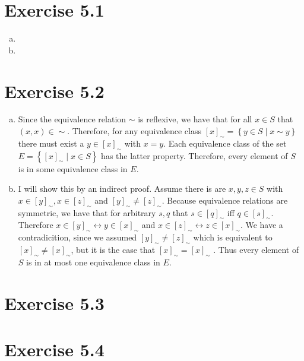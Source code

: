 \documentclass{article} %
\newcommand{\homeworkNumber}{5}
\begin{document}
\section*{Exercise \homeworkNumber.1}

\begin{enumerate}[(a)]
	\item
	\item
\end{enumerate}



\section*{Exercise \homeworkNumber.2}

\begin{enumerate}[(a)]
	\item Since the equivalence relation \( \sim \) is reflexive, we have that for all \( x \in S \) that \( (x, x) \in \sim \).
	      Therefore, for any equivalence class \( [x]_{\sim} =  \left\{ y \in S \mid x \sim y \right\}  \) there must exist a \( y \in [x]_{\sim}\) with \( x = y \).
	      Each equivalence class of the set \( E = \left\{  [x]_{\sim} \mid x \in S \right\} \) has the latter property.
	      Therefore, every element of \( S \) is in some equivalence class in \( E \).
	\item I will show this by an indirect proof.
	      Assume there is are \( x, y, z \in S\) with \( x \in [y]_{\sim}, x \in [z]_{\sim} \) and \( [y]_{\sim} \neq [z]_{\sim} \).
	      Because equivalence relations are symmetric, we have that for arbitrary \( s,q \) that \( s \in [q]_{\sim} \) iff \( q \in [s]_{\sim} \).
	      Therefore \( x \in [y]_{\sim} \leftrightarrow y \in [x]_{\sim}\) and \( x \in [z]_{\sim} \leftrightarrow z \in [x]_{\sim}\).
	      We have a contradicition, since we assumed \( [y]_{\sim} \neq [z]_{\sim} \) which is equivalent to \( [x]_{\sim} \neq [x]_{\sim} \), but it is the case that \( [x]_{\sim} = [x]_{\sim} \) .
	      Thus every element of \( S \) is in at most one equivalence class in \( E \).
\end{enumerate}



\section*{Exercise \homeworkNumber.3}



\section*{Exercise \homeworkNumber.4}
\end{document}
